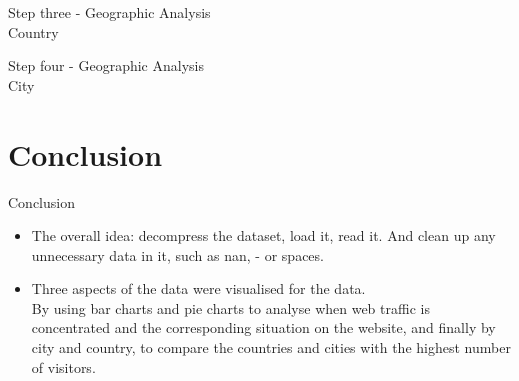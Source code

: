 \documentclass[
 size=14pt,
 paper=smartboard,  %
 mode=present, 		%
 display=slides, 	%
 style=tuliplab,  	%
 pauseslide,
 fleqn,leqno]{powerdot}
\begin{document}
\begin{slide}{Step three - Geographic Analysis\\		
	Country}

\begin{figure}[htbp]
	\centering
\end{figure}
\end{slide}

\begin{slide}{Step four - Geographic Analysis\\		
		City}
	\begin{figure}[htbp]
		\centering
	\end{figure}
	
\end{slide}

\section{Conclusion}

\begin{slide}[toc=,bm=]{Conclusion}
\begin{itemize}
\item
\smallskip
The overall idea: decompress the dataset, load it, read it. And clean up any unnecessary data in it, such as nan, - or spaces.

\item
\smallskip
Three aspects of the data were visualised for the data.\\

By using bar charts and pie charts to analyse when web traffic is concentrated and the corresponding situation on the website, and finally by city and country, to compare the countries and cities with the highest number of visitors.

\end{itemize}



\end{slide}
\end{document}
